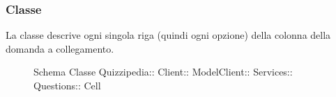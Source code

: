 \subsubsection{Classe }
La classe descrive ogni singola riga (quindi ogni opzione) della colonna della domanda a collegamento.
\begin{figure}[H]
\centering
\noindent{}
\caption[Schema Classe Cell]{Schema Classe Quizzipedia:: Client:: ModelClient:: Services:: Questions:: Cell}
\end{figure}
